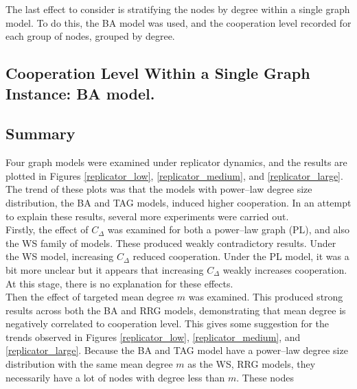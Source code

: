 The last effect to consider is stratifying the nodes by degree within a single graph model. To do this, the BA model was used, and the cooperation level recorded for each group of nodes, grouped by degree. \\

\subsection{Cooperation Level Within a Single Graph Instance: BA model. }

\subsection{Summary}
Four graph models were examined under replicator dynamics, and the results are plotted in Figures \ref{replicator_low}, \ref{replicator_medium}, and \ref{replicator_large}. The trend of these plots was that the models with power--law degree size distribution, the BA and TAG models, induced higher cooperation. In an attempt to explain these results, several more experiments were carried out. \\

Firstly, the effect of $C_\Delta$ was examined for both a power--law graph (PL), and also the WS family of models. These produced weakly contradictory results. Under the WS model, increasing $C_\Delta$ reduced cooperation. Under the PL model, it was a bit more unclear but it appears that increasing $C_\Delta$ weakly increases cooperation. At this stage, there is no explanation for these effects. \\

Then the effect of targeted mean degree $m$ was examined. This produced strong results across both the BA and RRG models, demonstrating that mean degree is negatively correlated to cooperation level. This gives some suggestion for the trends observed in Figures \ref{replicator_low}, \ref{replicator_medium}, and \ref{replicator_large}. Because the BA and TAG model have a power--law degree size distribution with the same mean degree $m$ as the WS, RRG models, they necessarily have a lot of nodes with degree less than $m$. These nodes  
